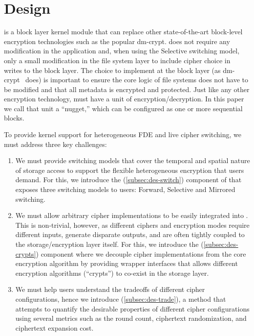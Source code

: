 \section{\sys Design}\label{sec:des}

\sys is a block layer kernel module that can replace other state-of-the-art
block-level encryption technologies such as the popular dm-crypt. \sys does not
require any modification in the application and, when using the Selective
switching model, only a small modification in the file system layer to include
cipher choice in writes to the block layer. The choice to implement \sys at the
block layer (as dm-crypt~\cite{dmcrypt} does) is important to ensure the core
logic of file systems does not have to be modified and that all metadata is
encrypted and protected. Just like any other encryption technology, \sys must
have a unit of encryption/decryption. In this paper we call that unit a
``nugget,'' which can be configured as one or more sequential blocks.

To provide kernel support for heterogeneous FDE and live cipher switching, we
must address three key challenges:

\begin{enumerate}

\item We must provide switching models that cover the temporal and spatial
  nature of storage access to support the flexible heterogeneous encryption that
  users demand. For this, we introduce the \sysA (\cref{subsec:des-switch})
  component of \sys that exposes three switching models to users: Forward,
  Selective and Mirrored switching.

\item We must allow arbitrary cipher implementations to be easily integrated
  into \sys. This is non-trivial, however, as different ciphers and encryption
  modes require different inputs, generate disparate outputs, and are often
  tightly coupled to the storage/encryption layer itself. For this, we introduce
  the \sysB (\cref{subsec:des-crypts}) component where we decouple cipher
  implementations from the core encryption algorithm by providing wrapper
  interfaces that allows different encryption algorithms (``crypts'') to
  co-exist in the storage layer.

\item We must help users understand the tradeoffs of different cipher
  configurations, hence we introduce \sysC (\cref{subsec:des-trade}), a method
  that attempts to quantify the desirable properties of different cipher
  configurations using several metrics such as the round count, ciphertext
  randomization, and ciphertext expansion cost.

\end{enumerate}

